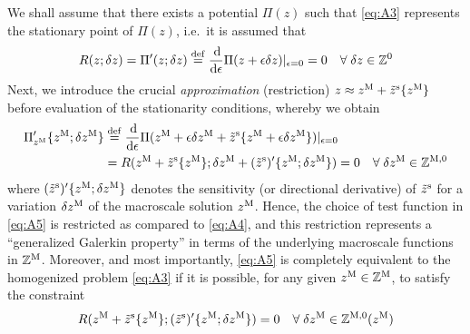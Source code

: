 \documentclass[12pt,a4paper]{article}
\begin{document}
We shall assume that there exists a potential $\Pi(z)$ such that \eqref{eq:A3} represents the stationary point of $\Pi(z)$, i.e.\ it is assumed that
\begin{align}
\label{eq:A4} R(z;\delta z) = \Pi'(z;\delta z) \overset{\mathrm{def}}{=} \frac{\operatorname{d \!}}{\operatorname{d \!}\epsilon}\Pi(z+\epsilon\delta z)|_{\epsilon = 0} = 0\quad \forall\;\delta z \in \mathbb{Z}^0
\end{align}
Next, we introduce the crucial \emph{approximation} (restriction) $z \approx z^{\mathrm{M}} + \tilde{z}^{\mathrm{s}}\{z^{\mathrm{M}}\}$ before evaluation of the stationarity conditions, whereby we obtain
\begin{align}
\label{eq:A5} \Pi_{z^{\mathrm{M}}}'\{z^{\mathrm{M}};\delta z^{\mathrm{M}}\} & \overset{\mathrm{def}}{=}
\frac{\operatorname{d \!}}{\operatorname{d \!}\epsilon}\Pi(z^{\mathrm{M}}+\epsilon \delta z^{\mathrm{M}}+\tilde{z}^{\mathrm{s}}\{z^{\mathrm{M}}+\epsilon \delta z^{\mathrm{M}}\})|_{\epsilon = 0} \nonumber \\
& =
R(z^{\mathrm{M}} + \tilde{z}^{\mathrm{s}}\{z^{\mathrm{M}}\}; \delta z^{\mathrm{M}} + (\tilde{z}^{\mathrm{s}})'\{z^{\mathrm{M}};\delta z^{\mathrm{M}}\}) = 0\quad \forall\;\delta z^{\mathrm{M}}\in\mathbb{Z}^{\mathrm{M},0}
\end{align}
where $(\tilde{z}^{\mathrm{s}})'\{z^{\mathrm{M}};\delta z^{\mathrm{M}}\}$ denotes the sensitivity (or directional derivative) of $\tilde z^{\mathrm{s}}$ for a variation $\delta z^{\mathrm{M}}$ of the macroscale solution $z^{\mathrm{M}}$.
Hence, the choice of test function in \eqref{eq:A5} is restricted as compared to \eqref{eq:A4}, and this restriction represents a ``generalized Galerkin property'' in terms of the underlying macroscale functions in $\mathbb{Z}^{\mathrm{M}}$.
Moreover, and most importantly, \eqref{eq:A5} is completely equivalent to the homogenized problem \eqref{eq:A3} if it is possible, for any given $z^{\mathrm{M}}\in\mathbb{Z}^{\mathrm{M}}$, to satisfy the constraint
\begin{align}
\label{eq:A6a} R(z^{\mathrm{M}} + \tilde z^{\mathrm{s}}\{z^{\mathrm{M}}\}; (\tilde{z}^{\mathrm{s}})'\{z^{\mathrm{M}};\delta z^{\mathrm{M}}\}) = 0\quad \forall\;\delta z^{\mathrm{M}}\in\mathbb{Z}^{\mathrm{M},0}(z^{\mathrm{M}})
\end{align}
\end{document}
